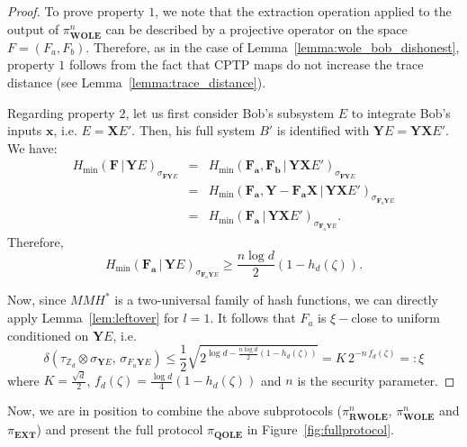 \begin{proof}

 To prove property $1$, we note that the extraction operation applied to the output of $\mathcal{\pi}^n_{\textbf{WOLE}}$ can be described by a projective operator on the space  $F = (F_{a}, F_{b})$. Therefore, as in the case of  Lemma~\ref{lemma:wole_bob_dishonest}, property $1$ follows from  the fact that CPTP maps do not increase the trace distance (see Lemma~\ref{lemma:trace_distance}).

Regarding property $2$,  let us first consider Bob's subsystem $E$  to integrate Bob's inputs $\bm{x}$, i.e. $E = \mathbf{X} E'$. Then, his full system $B'$ is identified with $\mathbf{Y} E=\mathbf{Y}\mathbf{X} E'$. We have:
\begin{eqnarray*}
H_{\min}(\mathbf{F}\, | \, \mathbf{Y} E)_{\sigma_{\mathbf{F}\mathbf{Y}E}} &=& H_{\min}(\mathbf{F}_{\bm{a}}, \mathbf{F}_{\bm{b}} \, | \, \mathbf{Y} \mathbf{X} E')_{\sigma_{\mathbf{F}\mathbf{Y}E}} \\
&=& H_{\min}(\mathbf{F}_{\bm{a}}, \mathbf{Y} - \mathbf{F}_{\bm{a}} \mathbf{X} \, | \, \mathbf{Y} \mathbf{X} E')_{\sigma_{\mathbf{F}_a\mathbf{Y}E}} \\
&=& H_{\min}(\mathbf{F}_{\bm{a}}\, | \, \mathbf{Y} \mathbf{X} E')_{\sigma_{\mathbf{F}_a\mathbf{Y}E}}.
\end{eqnarray*}
Therefore, 
$$H_{\min}(\mathbf{F}_{\bm{a}}\, | \, \mathbf{Y} E)_{\sigma_{\mathbf{F}_a\mathbf{Y}E}} \geq \frac{n\log d}{2} (1 - h_d(\zeta)).$$

Now, since $MMH^*$ is a two-universal family of hash functions, we can directly apply  Lemma~\ref{lem:leftover} for $l=1$. It follows that $F_a$ is $\xi-$close to uniform conditioned on $\mathbf{Y} E$, i.e.
$$\delta( \tau_{\mathbb{Z}_d} \otimes \sigma_{\mathbf{Y} E},\, \sigma_{F_{a} \mathbf{Y} E} ) \leq \frac{1}{2}\sqrt{2^{\log d - \frac{n\log d}{2}(1 - h_d(\zeta))}} = K\, 2^{-n \, f_d(\zeta)} =: \xi$$
where $K = \frac{\sqrt{d}}{2}$, $f_d(\zeta) = \frac{\log d}{4} (1-h_d(\zeta))$ and $n$ is the security parameter.

\end{proof}

Now, we are in position to combine the above subprotocols ($\pi^n_{\textbf{RWOLE}}$, $\pi^n_{\textbf{WOLE}}$ and $\pi_{\textbf{EXT}}$) and present the full protocol $\pi_{\textbf{QOLE}}$ in Figure~\ref{fig:fullprotocol}. 



